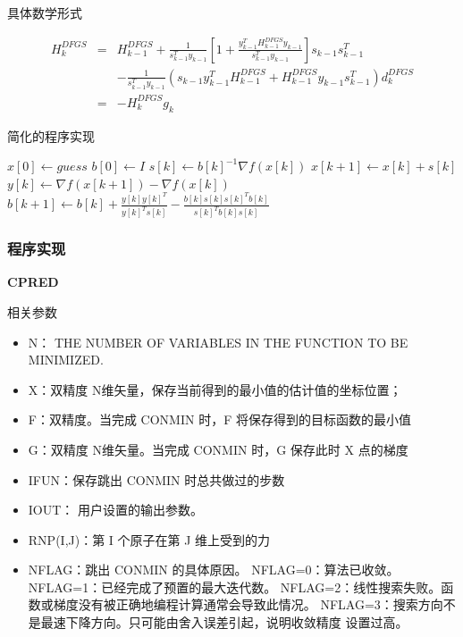\documentclass{ctexart}
\begin{document}
具体数学形式


\begin{eqnarray}
    H_{k}^{DFGS} &=& H_{k-1}^{DFGS} + \frac{1}{s_{k-1}^{T}y_{k-1}}[1+\frac{y_{k-1}^{T}H_{k-1}^{DFGS}y_{k-1}}{s_{k-1}^{T}y_{k-1}}]s_{k-1}s_{k-1}^{T}\nonumber\\
    &&-\frac{1}{s_{k-1}^{T}y_{k-1}}(s_{k-1}y_{k-1}^{T}H_{k-1}^{DFGS}+H_{k-1}^{DFGS}y_{k-1}s_{k-1}^{T})d_{k}^{DFGS}\nonumber\\
    &=& -H_{k}^{DFGS}g_{k}
\end{eqnarray}

简化的程序实现

\begin{algorithm}
    \begin{algorithmic}
        \STATE $x[0] \leftarrow guess$
        \STATE $b[0] \leftarrow I$
        \STATE $s[k] \leftarrow b[k]^{-1} \nabla f(x[k])$
        \STATE $x[k+1] \leftarrow x[k] + s[k]$
        \STATE $y[k] \leftarrow \nabla f(x[k+1]) - \nabla f(x[k])$
        \STATE $b[k+1] \leftarrow b[k] + \frac{y[k]y[k]^{T}}{y[k]^{T}s[k]} - \frac{b[k]s[k]s[k]^{T}b[k]}{s[k]^{T}b[k]s[k]}$
        \ENDFOR
    \end{algorithmic}
\end{algorithm}

\subsubsection{程序实现}
\noindent
\textbf{CPRED}

\noindent
相关参数
\begin{itemize}
    \item N：      THE NUMBER OF VARIABLES IN THE FUNCTION TO BE MINIMIZED.
    \item X：双精度 N维矢量，保存当前得到的最小值的估计值的坐标位置；
    \item F：双精度。当完成 CONMIN 时，F 将保存得到的目标函数的最小值
    \item G：双精度 N维矢量。当完成 CONMIN 时，G 保存此时 X 点的梯度
    \item IFUN：保存跳出 CONMIN 时总共做过的步数
    \item IOUT： 用户设置的输出参数。
    \item RNP(I,J)：第 I 个原子在第 J 维上受到的力
    \item NFLAG：跳出 CONMIN 的具体原因。
          NFLAG=0：算法已收敛。
          NFLAG=1：已经完成了预置的最大迭代数。
          NFLAG=2：线性搜索失败。函数或梯度没有被正确地编程计算通常会导致此情况。
          NFLAG=3：搜索方向不是最速下降方向。只可能由舍入误差引起，说明收敛精度 设置过高。
\end{itemize}
\end{document}
